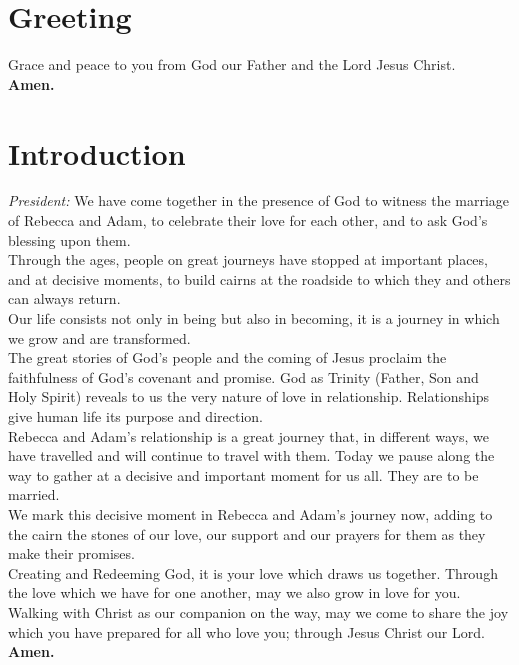 \documentclass[a4paper,10pt,titlepage]{article}
\begin{document}
\clearpage

\section{Greeting} 

Grace and peace to you from God our Father and the Lord Jesus Christ. \\

{\bf Amen.}

\section{Introduction} 
{\em President:} We have come together in the presence of God to witness the marriage of Rebecca and Adam, to celebrate their love for each other, and to ask God's blessing upon them.\\

Through the ages, people on great journeys have stopped at important places, and at decisive moments, to build cairns at the roadside to which they and others can always return.\\

Our life consists not only in being but also in becoming, it is a journey in which we grow and are transformed.\\

The great stories of God’s people and the coming of Jesus proclaim the faithfulness of God’s covenant and promise. God as Trinity (Father, Son and Holy Spirit) reveals to us the very nature of love in relationship. Relationships give human life its purpose and direction.\\

Rebecca and Adam's relationship is a great journey that, in different ways, we have travelled and will continue to travel with them. Today we pause along the way to gather at a decisive and important moment for us all. They are to be married.\\

We mark this decisive moment in Rebecca and Adam's journey now, adding to the cairn the stones of our love, our support and our prayers for them as they make their promises.\\

Creating and Redeeming God,\newline
it is your love which draws us together.\newline
Through the love which we have for one another,\newline
may we also grow in love for you.\newline
Walking with Christ as our companion on the way,\newline
may we come to share the joy\newline
which you have prepared for all who love you;\newline
through Jesus Christ our Lord.\newline\newline
{\bf Amen.}
\end{document}
